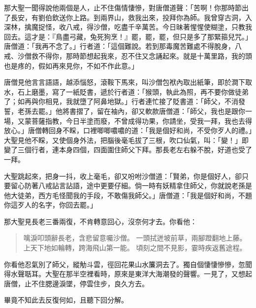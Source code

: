那大聖一聞得說他兩個是人，止不住傷情悽慘，對唐僧道聲：「苦啊！你那時節出了長安，有劉伯欽送你上路。到兩界山，救我出來，投拜你為師。我曾穿古洞，入深林，擒魔捉怪，收八戒，得沙僧，吃盡千辛萬苦。今日昧著惺惺使糊塗，只教我回去。這才是：『鳥盡弓藏，兔死狗烹！』罷，罷，罷，但只是多了那緊箍兒咒。」唐僧道：「我再不念了。」行者道：「這個難說。若到那毒魔苦難處不得脫身，八戒、沙僧救不得你，那時節想起我來，忍不住又念誦起來。就是十萬里路，我的頭也是疼的，假如再來見你，不如不作此意。」

唐僧見他言言語語，越添惱怒，滾鞍下馬來，叫沙僧包袱內取出紙筆，即於澗下取水，石上磨墨，寫了一紙貶書，遞於行者道：「猴頭，執此為照，再不要你做徒弟了；如再與你相見，我就墮了阿鼻地獄。」行者連忙接了貶書道：「師父，不消發誓，老孫去罷。」他將書摺了，留在袖內，卻又軟款唐僧道：「師父，我也是跟你一場，又蒙菩薩指教，今日半塗而廢，不曾成得功果，你請坐，受我一拜，我也去得放心。」唐僧轉回身不睬，口裡唧唧噥噥的道：「我是個好和尚，不受你歹人的禮。」大聖見他不睬，又使個身外法，把腦後毫毛拔了三根，吹口仙氣，叫：「變！」即變了三個行者，連本身四個，四面圍住師父下拜。那長老左右躲不脫，好道也受了一拜。

大聖跳起來，把身一抖，收上毫毛，卻又吩咐沙僧道：「賢弟，你是個好人，卻只要留心防著八戒詀言詀語，途中更要仔細。倘一時有妖精拿住師父，你就說老孫是他大徒弟，西方毛怪聞我的手段，不敢傷我師父。」唐僧道：「我是個好和尚，不題你這歹人的名字，你回去罷。」

那大聖見長老三番兩復，不肯轉意回心，沒奈何才去。你看他：
\begin{quote}
噙淚叩頭辭長老，含悲留意囑沙僧。
一頭拭迸坡前草，兩腳蹬翻地上藤。
上天下地如輪轉，跨海飛山第一能。
頃刻之間不見影，霎時疾返舊途程。
\end{quote}

你看他忍氣別了師父，縱觔斗雲，徑回花果山水簾洞去了。獨自個悽悽慘慘，忽聞得水聲聒耳。大聖在那半空裡看時，原來是東洋大海潮發的聲響。一見了，又想起唐僧，止不住腮邊淚墜，停雲住步，良久方去。

畢竟不知此去反復何如，且聽下回分解。
